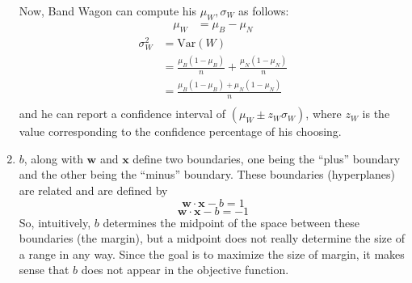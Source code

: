 \documentclass[12pt]{article}
\begin{document}
\begin{enumerate}
    Now, Band Wagon can compute his $\mu_W,\sigma_W$ as follows:
    \begin{equation}
      \begin{split}
        \mu_W&=\mu_B-\mu_N
      \end{split}
    \end{equation}
    \begin{equation}
      \begin{split}
        \sigma_W^2&=\text{Var}\left(W\right)\\
        &=\frac{\mu_B\left(1-\mu_B\right)}{n}+
          \frac{\mu_N\left(1-\mu_N\right)}{n}\\
        &=\frac{\mu_B\left(1-\mu_B\right)+\mu_N\left(1-\mu_N\right)}{n}\\
      \end{split}
    \end{equation}
    and he can report a confidence interval of
    $\left(\mu_W\pm z_W\sigma_W\right)$, where $z_W$ is the value
    corresponding to the confidence percentage of his choosing.\\
  \item
    $b$, along with $\mathbf{w}$ and $\mathbf{x}$ define two boundaries, one
    being the ``plus'' boundary and the other being the ``minus'' boundary.
    These boundaries (hyperplanes) are related and are defined by
    $$\mathbf{w}\cdot\mathbf{x}-b=1$$
    $$\mathbf{w}\cdot\mathbf{x}-b=-1$$
    So, intuitively, $b$ determines the midpoint of the space between these
    boundaries (the margin), but a midpoint does not really determine the size
    of a range in any way. Since the goal is to maximize the size of margin, it
    makes sense that $b$ does not appear in the objective function.
\end{enumerate}
\end{document}
